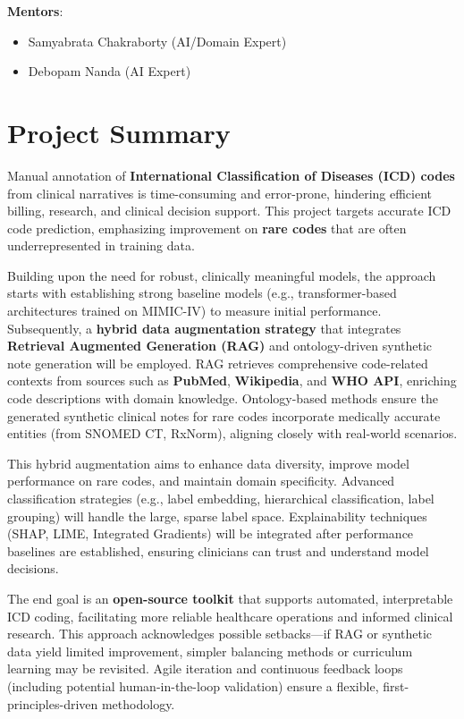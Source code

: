 \documentclass[10pt,a4paper]{article}
\begin{document}
\textbf{Mentors}: 
\begin{itemize}
    \item Samyabrata Chakraborty (AI/Domain Expert)
    \item Debopam Nanda (AI Expert)
\end{itemize}

\section{Project Summary}
Manual annotation of \textbf{International Classification of Diseases (ICD) codes} from clinical narratives is time-consuming and error-prone, hindering efficient billing, research, and clinical decision support. This project targets accurate ICD code prediction, emphasizing improvement on \textbf{rare codes} that are often underrepresented in training data.

Building upon the need for robust, clinically meaningful models, the approach starts with establishing strong baseline models (e.g., transformer-based architectures trained on MIMIC-IV) to measure initial performance. Subsequently, a \textbf{hybrid data augmentation strategy} that integrates \textbf{Retrieval Augmented Generation (RAG)} and ontology-driven synthetic note generation will be employed. RAG retrieves comprehensive code-related contexts from sources such as \textbf{PubMed}, \textbf{Wikipedia}, and \textbf{WHO API}, enriching code descriptions with domain knowledge. Ontology-based methods ensure the generated synthetic clinical notes for rare codes incorporate medically accurate entities (from SNOMED CT, RxNorm), aligning closely with real-world scenarios.

This hybrid augmentation aims to enhance data diversity, improve model performance on rare codes, and maintain domain specificity. Advanced classification strategies (e.g., label embedding, hierarchical classification, label grouping) will handle the large, sparse label space. Explainability techniques (SHAP, LIME, Integrated Gradients) will be integrated after performance baselines are established, ensuring clinicians can trust and understand model decisions.

The end goal is an \textbf{open-source toolkit} that supports automated, interpretable ICD coding, facilitating more reliable healthcare operations and informed clinical research. This approach acknowledges possible setbacks—if RAG or synthetic data yield limited improvement, simpler balancing methods or curriculum learning may be revisited. Agile iteration and continuous feedback loops (including potential human-in-the-loop validation) ensure a flexible, first-principles-driven methodology.
\end{document}

